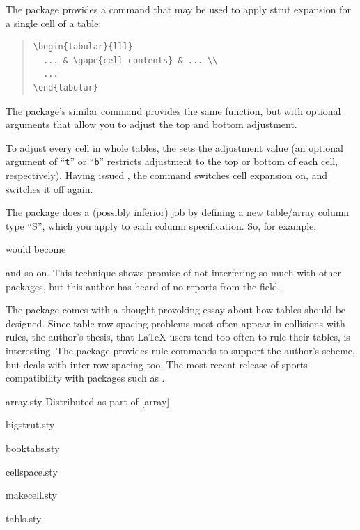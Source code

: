 The  package provides a command  that may
be used to apply strut expansion for a single cell of a table:
\begin{quote}
\begin{verbatim}
\begin{tabular}{lll}
  ... & \gape{cell contents} & ... \\
  ...
\end{tabular}
\end{verbatim}
\end{quote}
The package's similar  command provides the same function,
but with optional arguments that allow you to adjust the top and
bottom adjustment.

To adjust every cell in whole tables, the
 sets the adjustment value (an
optional argument of ``\texttt{t}'' or ``\texttt{b}'' restricts
adjustment to the top or bottom of each cell, respectively).  Having
issued , the command  switches
cell expansion on, and  switches it off again.

The  package does a (possibly inferior) job by
defining a new table/array column type ``S'', which you apply to each
column specification.  So, for example,
\begin{quote}
\end{quote}
would become
\begin{quote}
\end{quote}
and so on.  This technique shows
promise of not interfering so much with other packages, but this
author has heard of no reports from the field.

The  package comes with a thought-provoking essay
about how tables should be designed.  Since table row-spacing problems
most often appear in collisions with rules, the author's thesis,
that \LaTeX{} users tend too often to rule their tables, is
interesting.  The package provides rule commands to support the
author's scheme, but deals with inter-row spacing too.  The most
recent release of  sports compatibility with
packages such as .
\begin{ctanrefs}
\item[array.sty]Distributed as part of [array]
\item[bigstrut.sty]
\item[booktabs.sty]
\item[cellspace.sty]
\item[makecell.sty]
\item[tabls.sty]
\end{ctanrefs}

